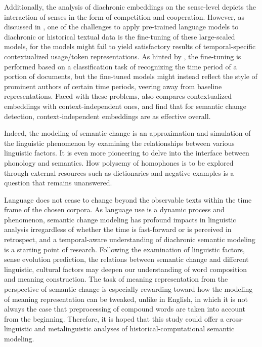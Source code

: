 Additionally, the analysis of diachronic embeddings on the sense-level depicts the interaction of senses in the form of competition and cooperation. However, as discussed in \textcite{giulianelli2019lexical}, one of the challenges to apply pre-trained language models to diachronic or historical textual data is the fine-tuning of these large-scaled models, for the models might fail to yield satisfactory results of temporal-specific contextualized usage/token representations. As hinted by \textcite{giulianelli2019lexical}, the fine-tuning is performed based on a classification task of recognizing the time period of a portion of documents, but the fine-tuned models might instead reflect the style of prominent authors of certain time periods, veering away from baseline representations. Faced with these problems, \textcite{kutuzov2020uio} also compares contextualized embeddings with context-independent ones, and find that for semantic change detection, context-independent embeddings are as effective overall.

Indeed, the modeling of semantic change is an approximation and simulation of the linguistic phenomenon by examining the relationships between various linguistic factors. It is even more pioneering to delve into the interface between phonology and semantics. How polysemy of homophones is to be explored through external resources such as dictionaries and negative examples \textcite[15]{traugott2001regularity} is a question that remains unanswered.

Language does not cease to change beyond the observable texts within the time frame of the chosen corpora. As language use is a dynamic process and phenomenon, semantic change modeling has profound impacts in linguistic analysis irregardless of whether the time is fast-forward or is perceived in retrospect, and a temporal-aware understanding of diachronic semantic modeling is a starting point of research. Following the examination of linguistic factors, sense evolution prediction, the relations between semantic change and different linguistic, cultural factors may deepen our understanding of word composition and meaning construction. The task of meaning representation from the perspective of semantic change is especially rewarding toward how the modeling of meaning representation can be tweaked, unlike in English, in which it is not always the case that preprocessing of compound words are taken into account from the beginning. Therefore, it is hoped that this study could offer a cross-linguistic and metalinguistic analyses of historical-computational semantic modeling.

